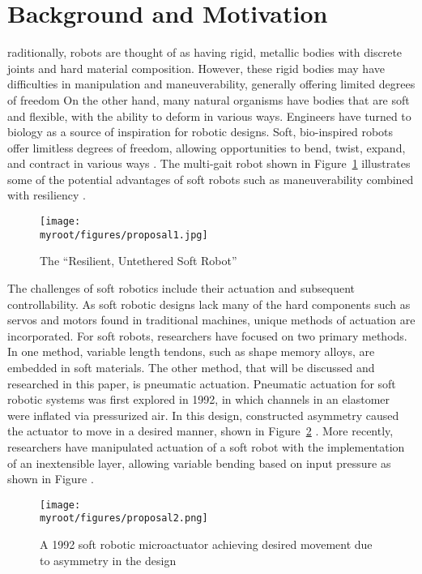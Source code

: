 \documentclass{IEEEtran}
\newcommand{\myroot}{../}
\begin{document}
\section{Background and Motivation}
raditionally, robots are thought of as having rigid, metallic bodies with discrete joints and hard material composition.  However, these rigid bodies may have difficulties in manipulation and maneuverability, generally offering limited degrees of freedom On the other hand, many natural organisms have bodies that are soft and flexible, with the ability to deform in various ways.  Engineers have turned to biology as a source of inspiration for robotic designs.  Soft, bio-inspired robots offer limitless degrees of freedom, allowing opportunities to bend, twist, expand, and contract in various ways \cite{rus2015design}.  The multi-gait robot shown in Figure~\ref{f1} illustrates some of the potential advantages of soft robots such as maneuverability combined with resiliency \cite{shepherd2011multigait}.
\begin{figure}[hb]
\begin{center}
\texttt{[image: \\myroot/figures/proposal1.jpg]}
\end{center}
\caption{The ``Resilient, Untethered Soft Robot'' \cite{shepherd2011multigait}}
\label{f1}
\end{figure}

The challenges of soft robotics include their actuation and subsequent controllability.  As soft robotic designs lack many of the hard components such as servos and motors found in traditional machines, unique methods of actuation are incorporated.  For soft robots, researchers have focused on two primary methods.  In one method, variable length tendons, such as shape memory alloys, are embedded in soft materials.  The other method, that will be discussed and researched in this paper, is pneumatic actuation.  Pneumatic actuation for soft robotic systems was first explored in 1992, in which channels in an elastomer were inflated via pressurized air.  In this design, constructed asymmetry caused the actuator to move in a desired manner, shown in Figure~\ref{f2} \cite{tanaka1992applying}.  More recently, researchers have manipulated actuation of a soft robot with the implementation of an inextensible layer, allowing variable bending based on input pressure as shown in Figure \cite{polygerinos2015modeling}.
\begin{figure}
\begin{center}
\texttt{[image: \\myroot/figures/proposal2.png]}
\end{center}
\caption{A 1992 soft robotic microactuator achieving desired movement due to asymmetry in the design \cite{tanaka1992applying}}
\label{f2}
\end{figure}
\end{document}
